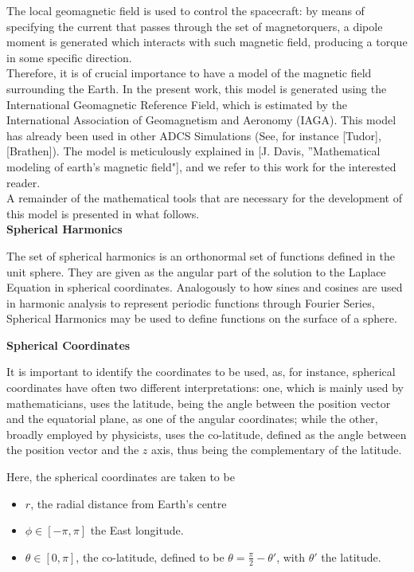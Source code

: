 \graphicspath{{figures/}}
The local geomagnetic field is used to control the spacecraft: by means of specifying the current that passes through the set of magnetorquers, a dipole moment is generated which interacts with such magnetic field, producing a torque in some specific direction.\\
Therefore, it is of crucial importance to have a model of the magnetic field surrounding the Earth. In the present work, this model is generated using the International Geomagnetic Reference Field, which is estimated by the International Association of Geomagnetism and Aeronomy (IAGA). This model has already been used in other ADCS Simulations (See, for instance [Tudor], [Brathen]). The model is meticulously explained in [J. Davis, ''Mathematical modeling of earth’s magnetic field"], and we refer to this work for the interested reader.\\

A remainder of the mathematical tools that are necessary for the development of this model is presented in what follows.\\

{\bf Spherical Harmonics}

The set of spherical harmonics is an orthonormal set of functions defined in the unit sphere. They are given as the angular part of the solution to the Laplace Equation in spherical coordinates. Analogously to how sines and cosines are used in harmonic analysis to represent periodic functions through Fourier Series, Spherical Harmonics may be used to define functions on the surface of a sphere.

{\bf Spherical Coordinates}

It is important to identify the coordinates to be used, as, for instance, spherical coordinates have often two different interpretations: one, which is mainly used by mathematicians, uses the latitude, being the angle between the position vector and the equatorial plane, as one of the angular coordinates; while the other, broadly employed by physicists, uses the co-latitude, defined as the angle between the position vector and the $z$ axis, thus being the complementary of the latitude. 

Here, the spherical coordinates are taken to be
\begin{itemize} 
\item[] $r$, the radial distance from Earth's centre
\item[] $\phi \in \left[-\pi,\pi\right]$ the East longitude.
\item[] $\theta \in \left[0,\pi\right]$, the co-latitude, defined to be $\theta = \frac{\pi}{2} - \theta'$, with $\theta'$ the latitude. 
\end{itemize}

